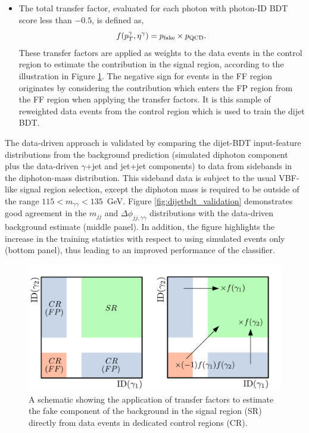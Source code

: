 \begin{itemize}
    \item The total transfer factor, evaluated for each photon with photon-ID BDT score less than $-0.5$, is defined as,
    \begin{equation}
        f(p_T^\gamma,\eta^\gamma) = p_{\rm{fake}} \times p_{\rm{QCD}}.
    \end{equation}
    These transfer factors are applied as weights to the data events in the control region to estimate the contribution in the signal region, according to the illustration in Figure \ref{fig:dijetbdt_transferfunctions}. The negative sign for events in the FF region originates by considering the contribution which enters the FP region from the FF region when applying the transfer factors. It is this sample of reweighted data events from the control region which is used to train the dijet BDT.
\end{itemize}

The data-driven approach is validated by comparing the dijet-BDT input-feature distributions from the background prediction (simulated diphoton component plus the data-driven $\gamma$+jet and jet+jet components) to data from sidebands in the diphoton-mass distribution. This sideband data is subject to the usual VBF-like signal region selection, except the diphoton mass is required to be outside of the range $115<m_{\gamma\gamma}<135$~GeV. Figure \ref{fig:dijetbdt_validation} demonstrates good agreement in the $m_{jj}$ and $\Delta\phi_{jj,\gamma\gamma}$ distributions with the data-driven background estimate (middle panel). In addition, the figure highlights the increase in the training statistics with respect to using simulated events only (bottom panel), thus leading to an improved performance of the classifier. 

\begin{figure}
  \centering
  \includegraphics[width=.8\textwidth]{Figures/hgg_overview/dijetbdt_illustration.pdf}
  \caption[Illustration of the data-driven background estimate method for the dijet BDT]
  {
    A schematic showing the application of transfer factors to estimate the fake component of the background in the signal region (SR) directly from data events in dedicated control regions (CR).
  }
  \label{fig:dijetbdt_transferfunctions}
\end{figure}

